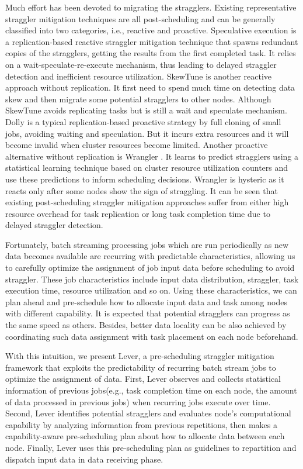 \documentclass[10pt,conference,compsocconf,letterpaper]{IEEEtran}
\begin{document}
  Much effort has been devoted to migrating the stragglers. Existing representative straggler mitigation techniques are all post-scheduling and can be generally classified into two categories, i.e., reactive and proactive. Speculative execution \cite{Dean2004} is a replication-based reactive straggler mitigation technique that spawns redundant copies of the stragglers, getting the results from the first completed task. It relies on a wait-speculate-re-execute mechanism, thus leading to delayed straggler detection and inefficient resource utilization. SkewTune \cite{Kwon2012} is another reactive approach without replication. It first need to spend much time on detecting data skew and then  migrate some potential stragglers to other nodes. Although SkewTune avoids replicating tasks but is still a wait and speculate mechanism. Dolly \cite{Ananthanarayanan2013} is a typical replication-based proactive strategy by full cloning of small jobs, avoiding waiting and speculation. But it incurs extra resources and it will become invalid when cluster resources become limited. Another proactive alternative without replication is Wrangler \cite{Yadwadkar2014}. It learns to predict stragglers using a statistical learning technique based on cluster resource utilization counters and use these predictions to inform scheduling decisions. Wrangler is hysteric as it reacts only after some nodes show the sign of straggling. It can be seen that existing post-scheduling straggler mitigation approaches suffer from either high resource overhead for task replication or long task completion time due to delayed straggler detection.

  Fortunately, batch streaming processing jobs which are run periodically as new data becomes available \cite{Zaharia2013} are recurring with predictable characteristics, allowing us to carefully optimize the assignment of job input data before scheduling to avoid straggler. These job characteristics include input data distribution, straggler, task execution time, resource utilization and so on. Using these characteristics, we can plan ahead and pre-schedule how to allocate input data and task among nodes with different capability. It is expected that potential stragglers can progress as the same speed as others. Besides, better data locality can be also achieved by coordinating such data assignment with task placement on each node beforehand.

  With this intuition, we present Lever, a pre-scheduling straggler mitigation framework that exploits the predictability of recurring batch stream jobs to optimize the assignment of data. First, Lever observes and collects statistical information of previous jobs(e.g., task completion time on each node, the amount of data processed in previous jobs) when recurring jobs execute over time. Second, Lever identifies potential stragglers and evaluates node's computational capability by analyzing information from previous repetitions, then makes a capability-aware pre-scheduling plan about how to allocate data between each node. Finally, Lever uses this pre-scheduling plan as guidelines to repartition and dispatch input data in data receiving phase.
\end{document}
